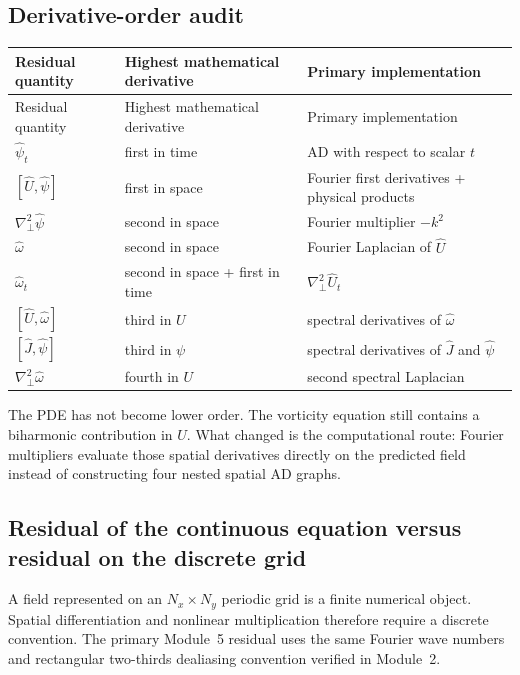\documentclass[11pt]{article}
\newcommand{\Lap}{\nabla_\perp^2}
\begin{document}
\subsection{Derivative-order audit}
\begin{longtable}{p{}p{}p{}}
\toprule
Residual quantity & Highest mathematical derivative & Primary implementation \\
\midrule
\endfirsthead
\toprule
Residual quantity & Highest mathematical derivative & Primary implementation \\
\midrule
\endhead
$\widehat\psi_t$ & first in time & AD with respect to scalar $t$ \\
$[\widehat U,\widehat\psi]$ & first in space & Fourier first derivatives + physical products \\
$\Lap\widehat\psi$ & second in space & Fourier multiplier $-k^2$ \\
$\widehat\omega$ & second in space & Fourier Laplacian of $\widehat U$ \\
$\widehat\omega_t$ & second in space + first in time & $\Lap\widehat U_t$ \\
$[\widehat U,\widehat\omega]$ & third in $U$ & spectral derivatives of $\widehat\omega$ \\
$[\widehat J,\widehat\psi]$ & third in $\psi$ & spectral derivatives of $\widehat J$ and $\widehat\psi$ \\
$\Lap\widehat\omega$ & fourth in $U$ & second spectral Laplacian \\
\bottomrule
\end{longtable}

\begin{checkpointbox}
The PDE has not become lower order. The vorticity equation still contains a biharmonic contribution in $U$. What changed is the computational route: Fourier multipliers evaluate those spatial derivatives directly on the predicted field instead of constructing four nested spatial AD graphs.
\end{checkpointbox}

\subsection{Residual of the continuous equation versus residual on the discrete grid}
A field represented on an $N_x\times N_y$ periodic grid is a finite numerical object. Spatial differentiation and nonlinear multiplication therefore require a discrete convention. The primary Module~5 residual uses the same Fourier wave numbers and rectangular two-thirds dealiasing convention verified in Module~2.
\end{document}

